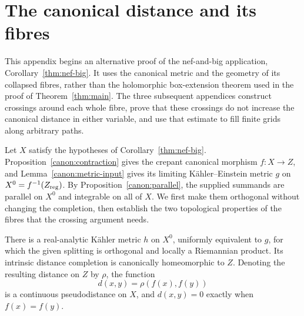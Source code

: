 \section{The canonical distance and its fibres}\label{app:collapsed}

This appendix begins an alternative proof of the nef-and-big application,
Corollary~\ref{thm:nef-big}. It uses the canonical metric and the geometry of
its collapsed fibres, rather than the holomorphic box-extension theorem
used in the proof of Theorem~\ref{thm:main}. The three subsequent
appendices construct crossings around each whole fibre, prove that these
crossings do not increase the canonical distance in either variable,
and use that estimate to fill finite grids along arbitrary paths.

Let \(X\) satisfy the hypotheses of Corollary~\ref{thm:nef-big}.
Proposition~\ref{canon:contraction} gives the crepant canonical morphism
\(f:X\to Z\), and Lemma~\ref{canon:metric-input} gives its limiting
K\"ahler--Einstein metric \(g\) on
\(X^0=f^{-1}(Z_{\mathrm{reg}})\). By Proposition~\ref{canon:parallel}, the
supplied summands are parallel on \(X^0\) and integrable on all of
\(X\). We first make them orthogonal without changing the completion,
then establish the two topological properties of the fibres that the
crossing argument needs.

\begin{proposition}\label{canon:pseudodistance}
There is a real-analytic Kähler metric \(h\) on \(X^0\), uniformly
equivalent to \(g\), for which the given splitting is orthogonal and
locally a Riemannian product.  Its intrinsic distance completion is
canonically homeomorphic to \(Z\).  Denoting the resulting distance
on \(Z\) by \(\rho\), the function
\begin{equation}\label{canon:d}
 d(x,y)=\rho(f(x),f(y))
\end{equation}
is a continuous pseudodistance on \(X\), and \(d(x,y)=0\) exactly
when \(f(x)=f(y)\).
\end{proposition}

